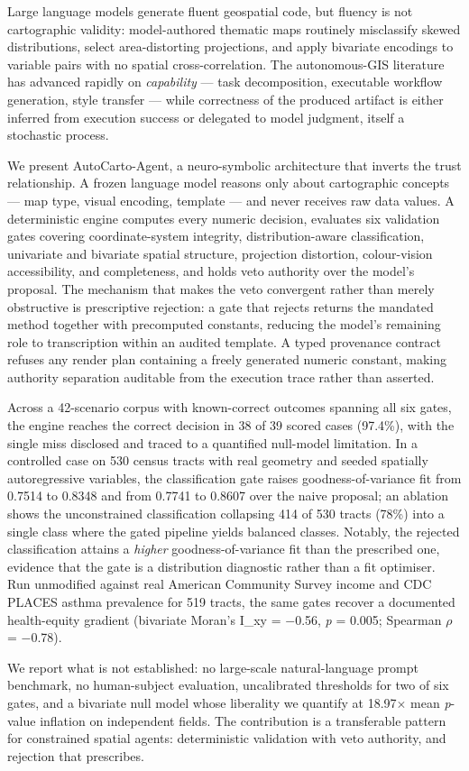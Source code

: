 Large language models generate fluent geospatial code, but fluency is not cartographic validity: model-authored thematic maps routinely misclassify skewed distributions, select area-distorting projections, and apply bivariate encodings to variable pairs with no spatial cross-correlation. The autonomous-GIS literature has advanced rapidly on \emph{capability} --- task decomposition, executable workflow generation, style transfer --- while correctness of the produced artifact is either inferred from execution success or delegated to model judgment, itself a stochastic process.

We present AutoCarto-Agent, a neuro-symbolic architecture that inverts the trust relationship. A frozen language model reasons only about cartographic concepts --- map type, visual encoding, template --- and never receives raw data values. A deterministic engine computes every numeric decision, evaluates six validation gates covering coordinate-system integrity, distribution-aware classification, univariate and bivariate spatial structure, projection distortion, colour-vision accessibility, and completeness, and holds veto authority over the model's proposal. The mechanism that makes the veto convergent rather than merely obstructive is prescriptive rejection: a gate that rejects returns the mandated method together with precomputed constants, reducing the model's remaining role to transcription within an audited template. A typed provenance contract refuses any render plan containing a freely generated numeric constant, making authority separation auditable from the execution trace rather than asserted.

Across a 42-scenario corpus with known-correct outcomes spanning all six gates, the engine reaches the correct decision in 38 of 39 scored cases (97.4\%), with the single miss disclosed and traced to a quantified null-model limitation. In a controlled case on 530 census tracts with real geometry and seeded spatially autoregressive variables, the classification gate raises goodness-of-variance fit from 0.7514 to 0.8348 and from 0.7741 to 0.8607 over the naive proposal; an ablation shows the unconstrained classification collapsing 414 of 530 tracts (78\%) into a single class where the gated pipeline yields balanced classes. Notably, the rejected classification attains a \emph{higher} goodness-of-variance fit than the prescribed one, evidence that the gate is a distribution diagnostic rather than a fit optimiser. Run unmodified against real American Community Survey income and CDC PLACES asthma prevalence for 519 tracts, the same gates recover a documented health-equity gradient (bivariate Moran's I\_xy = $-$0.56, \emph{p} = 0.005; Spearman $\rho$ = $-$0.78).

We report what is not established: no large-scale natural-language prompt benchmark, no human-subject evaluation, uncalibrated thresholds for two of six gates, and a bivariate null model whose liberality we quantify at 18.97$\times$ mean \emph{p}-value inflation on independent fields. The contribution is a transferable pattern for constrained spatial agents: deterministic validation with veto authority, and rejection that prescribes.
